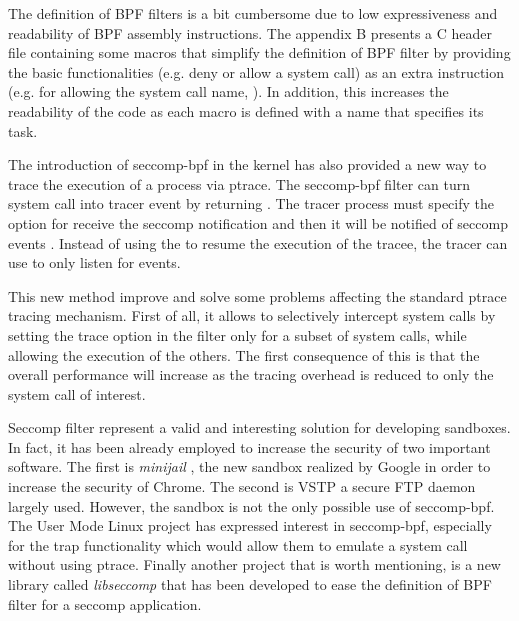 The definition of BPF filters is a bit cumbersome due to low expressiveness and readability of BPF assembly instructions. The appendix B presents a C header file containing some  macros that simplify the definition of BPF filter by providing the basic functionalities (e.g. deny or allow a system call) as an extra instruction (e.g. for allowing the system call name, ). In addition, this increases the readability of the code as each macro is defined with a name that specifies its task. 

The introduction of seccomp-bpf in the kernel has also provided a new way to trace the execution of a process via ptrace. The seccomp-bpf filter can turn system call into tracer event by returning . The tracer process must specify the option  for receive the seccomp notification  and then it will be notified of seccomp events . Instead of using the  to resume the execution of the tracee, the tracer can use  to only listen for events.

This new method improve and solve some problems affecting the standard ptrace tracing mechanism. First of all, it allows to selectively intercept system calls by setting the trace option in the filter only for a subset of system calls, while allowing the execution of the others. The first consequence of this is that the overall performance will increase as the tracing overhead is reduced to only the system call of interest. 


Seccomp filter represent a valid and interesting solution for developing sandboxes. In  fact, it has been already employed to increase the security of two important software. The first is \emph{minijail} \cite{minijail}, the new sandbox realized by Google in order to increase the security of Chrome. The second is VSTP \cite{vsftp} a secure FTP daemon largely used. However, the sandbox is not the only possible use of seccomp-bpf. The User Mode Linux project has expressed interest in seccomp-bpf, especially for the trap functionality which would allow them to emulate a system call without using ptrace. Finally another project that is worth mentioning, is a new library called \emph{libseccomp} \cite{libseccomp} that has been developed to ease the definition of BPF filter for a seccomp application.   
